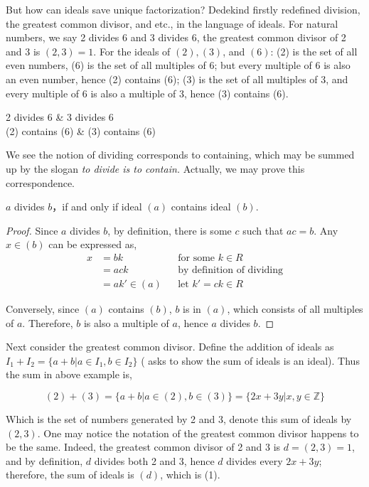 \documentclass[b5paper]{article}
\begin{document}
But how can ideals save unique factorization? Dedekind firstly redefined division, the greatest common divisor, and etc., in the language of ideals. For natural numbers, we say 2 divides 6 and 3 divides 6, the greatest common divisor of 2 and 3 is $(2, 3) = 1$. For the ideals of $(2), (3)$, and $(6)$: (2) is the set of all even numbers, (6) is the set of all multiples of 6; but every multiple of 6 is also an even number, hence (2) contains (6); (3) is the set of all multiples of 3, and every multiple of 6 is also a multiple of 3, hence (3) contains (6).

2 divides 6 & 3 divides 6 \\
(2) contains (6) & (3) contains (6)
\etab

We see the notion of dividing corresponds to containing, which may be summed up by the slogan \emph{to divide is to contain.} Actually, we may prove this correspondence.

\begin{proposition}
$a$ divides $b$，if and only if ideal $(a)$ contains ideal $(b)$.
\end{proposition}

\begin{proof}
Since $a$ divides $b$, by definition, there is some $c$ such that $ac = b$. Any $x \in (b)$ can be expressed as,
\begin{align*}
x &= bk  &&\text{for some }k \in R \\
  &= ack &&\text{by definition of dividing} \\
  &= ak' \in (a) &&\text{let }k' = ck \in R
\end{align*}

Conversely, since $(a)$ contains $(b)$, $b$ is in $(a)$, which consists of all multiples of $a$. Therefore, $b$ is also a multiple of $a$, hence $a$ divides $b$.
\end{proof}

Next consider the greatest common divisor. Define the addition of ideals as $I_1 + I_2 = \{a + b | a \in I_1, b \in I_2\}$ ( asks to show the sum of ideals is an ideal). Thus the sum in above example is,

\[
(2) + (3) = \{a + b| a \in (2), b \in (3)\} = \{2x + 3y | x, y \in \mathbb{Z} \}
\]

Which is the set of numbers generated by 2 and 3, denote this sum of ideals by $(2, 3)$. One may notice the notation of the greatest common divisor happens to be the same. Indeed, the greatest common divisor of 2 and 3 is $d = (2, 3) = 1$, and by definition, $d$ divides both 2 and 3, hence $d$ divides every $2x + 3y$; therefore, the sum of ideals is $(d)$, which is (1).
\end{document}
